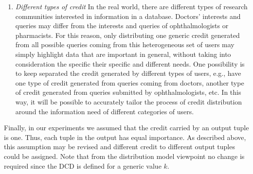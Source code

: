 \documentclass[preprint,12pt,sort&compress]{elsarticle}
\newcommand{\rone}[1]{\textcolor{reviewer1}{#1}}
\newcommand{\eat}[1]{}
\begin{document}
{\begin{enumerate}
	\item \emph{Different types of credit} In the real world, there are different types of research communities interested in information in a database. Doctors' interests and queries may differ from the interests and queries of ophthalmologists or pharmacists. For this reason, only distributing one generic credit generated from all possible queries coming from this heterogeneous set of users may simply highlight data that are important in general, without taking into consideration the specific their specific and different needs. One possibility is to keep separated the credit generated by different types of users, e.g., have one type of credit generated from queries coming from doctors, another type of credit generated from queries submitted by ophthalmologists, etc. In this way, it will be possible to accurately tailor the process of credit distribution around the information need of different categories of users. 
\end{enumerate}
}


\eat{
\rone{Finally, in our experiments we assumed that the credit carried by an output tuple is one. Thus, each tuple in the output has equal importance. As described above, this assumption may be revised and different credit to different output tuples could be assigned.}


\rone{Nonetheless, from the distribution models viewpoint no change is required since the DCD is defined for a generic value $k$. Of course, note that if the quantity of credit carried by an output tuple changes, as a consequence the final distribution will change too, since certain tuples will be more ``impactful'' (i.e., distribute more credit) than others.}
}

\rone{Finally, in our experiments we assumed that the credit carried by an output tuple is one. Thus, each tuple in the output has equal importance. As described above, this assumption may be revised and different credit to different output tuples could be assigned.  Note that from the distribution model viewpoint no change is required since the DCD is defined for a generic value $k$. }
\end{document}
